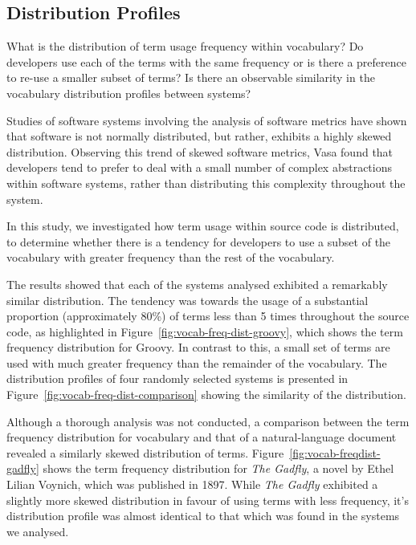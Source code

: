 \subsection{Distribution Profiles} %
\label{sub:distribution_profiles}

What is the distribution of term usage frequency within vocabulary? Do developers use each of the terms with the same frequency or is there a preference to re-use a smaller subset of terms? Is there an observable similarity in the vocabulary distribution profiles between systems?

Studies of software systems involving the analysis of software metrics have shown that software is not normally distributed, but rather, exhibits a highly skewed distribution. Observing this trend of skewed software metrics, Vasa \cite{Vasa10a} found that developers tend to prefer to deal with a small number of complex abstractions within software systems, rather than distributing this complexity throughout the system.

In this study, we investigated how term usage within source code is distributed, to determine whether there is a tendency for developers to use a subset of the vocabulary with greater frequency than the rest of the vocabulary.

The results showed that each of the systems analysed exhibited a remarkably similar distribution. The tendency was towards the usage of a substantial proportion (approximately 80\%) of terms less than 5 times throughout the source code, as highlighted in Figure~\ref{fig:vocab-freq-dist-groovy}, which shows the term frequency distribution for Groovy. In contrast to this, a small set of terms are used with much greater frequency than the remainder of the vocabulary. The distribution profiles of four randomly selected systems is presented in Figure~\ref{fig:vocab-freq-dist-comparison} showing the similarity of the distribution.

Although a thorough analysis was not conducted, a comparison between the term frequency distribution for vocabulary and that of a natural-language document revealed a similarly skewed distribution of terms. Figure~\ref{fig:vocab-freqdist-gadfly} shows the term frequency distribution for \emph{The Gadfly}, a novel by Ethel Lilian Voynich, which was published in 1897. While \emph{The Gadfly} exhibited a slightly more skewed distribution in favour of using terms with less frequency, it's distribution profile was almost identical to that which was found in the systems we analysed.

